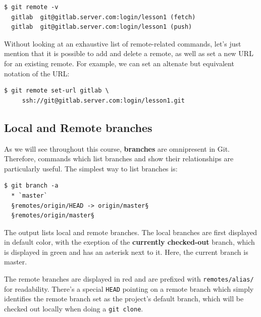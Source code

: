 \documentclass{../../common/tufte-latex/tufte-handout}
\begin{document}
\begin{lstlisting}[style=BashInputStyle]
  $ git remote -v
  gitlab  git@gitlab.server.com:login/lesson1 (fetch)
  gitlab  git@gitlab.server.com:login/lesson1 (push)
\end{lstlisting}

Without looking at an exhaustive list of remote-related commands, let's just mention that it is possible to add and delete a remote, as well as set a new URL for an existing remote.
For example, we can set an altenate but equivalent notation of the URL:


\begin{lstlisting}[style=BashInputStyle]
  $ git remote set-url gitlab \
     ssh://git@gitlab.server.com:login/lesson1.git
\end{lstlisting}

\subsection{Local and Remote branches}

As we will see throughout this course, \textbf{branches} are omnipresent in Git.
Therefore, commands which list branches and show their relationships are particularly useful.
The simplest way to list branches is:


\begin{lstlisting}[style=BashInputStyle]
  $ git branch -a
  * `master`
  §remotes/origin/HEAD -> origin/master§
  §remotes/origin/master§
\end{lstlisting}

The output lists local and remote branches.
The local branches are first displayed in default color, with the exeption of the \textbf{currently checked-out} branch, which is displayed in green and has an asterisk next to it.
Here, the current branch is master.

The remote branches are displayed in red and are prefixed with \texttt{remotes/alias/} for readability.
There's a special \texttt{HEAD} pointing on a remote branch which simply identifies the remote branch set as the project's default branch, which will be checked out locally when doing a \texttt{git clone}.
\end{document}
